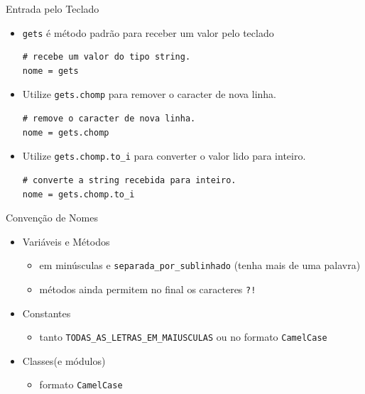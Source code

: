 \begin{frame}[fragile,t]{Entrada pelo Teclado}
  \begin{itemize}
    \item \verb!gets! é método padrão para receber um valor pelo teclado 
		\begin{lstlisting}[style=RubyInputStyle]
# recebe um valor do tipo string.
nome = gets
  	\end{lstlisting}
    \item Utilize \verb!gets.chomp! para remover o caracter de nova linha.
		\begin{lstlisting}[style=RubyInputStyle]
# remove o caracter de nova linha.
nome = gets.chomp
  	\end{lstlisting}
  	\item Utilize \verb!gets.chomp.to_i! para converter o valor lido para inteiro. 
		\begin{lstlisting}[style=RubyInputStyle]
# converte a string recebida para inteiro.
nome = gets.chomp.to_i
  	\end{lstlisting}
  \end{itemize}   
\end{frame}
\begin{frame}[fragile,t]{Convenção de Nomes}
  \begin{itemize}
    \item Variáveis e Métodos
    \begin{itemize}
    	\item em minúsculas e \verb!separada_por_sublinhado! (tenha mais de uma palavra)
    	\item métodos ainda permitem no final os caracteres \verb|?!|
    \end{itemize}
    \item Constantes
    \begin{itemize}
    	\item tanto \verb!TODAS_AS_LETRAS_EM_MAIUSCULAS! ou no formato \verb!CamelCase!
    \end{itemize}
    \item Classes(e módulos)
    \begin{itemize}
    	\item formato \verb!CamelCase! 
    \end{itemize}
  \end{itemize}
\end{frame}
